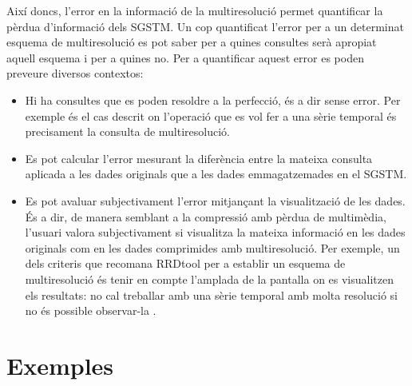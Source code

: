 Així doncs, l'error en la informació de la multiresolució permet
quantificar la pèrdua d'informació dels \gls{SGSTM}. Un cop
quantificat l'error per a un determinat esquema de multiresolució es
pot saber per a quines consultes serà apropiat aquell esquema i per a
quines no. Per a quantificar aquest error es poden preveure diversos
contextos:
\begin{itemize}
\item Hi ha consultes que es poden resoldre a la perfecció, és a dir
  sense error. Per exemple és el cas descrit on l'operació que es vol
  fer a una sèrie temporal és precisament la consulta de
  multiresolució.

\item Es pot calcular l'error mesurant la diferència entre la mateixa
  consulta aplicada a les dades originals que a les dades
  emmagatzemades en el \gls{SGSTM}.

\item Es pot avaluar subjectivament l'error mitjançant la
  visualització de les dades. És a dir, de manera semblant a la
  compressió amb pèrdua de multimèdia, l'usuari valora subjectivament
  si visualitza la mateixa informació en les dades originals com en
  les dades comprimides amb multiresolució. Per exemple, un dels
  criteris que recomana RRDtool per a establir un esquema de
  multiresolució és tenir en compte l'amplada de la pantalla on es
  visualitzen els resultats: no cal treballar amb una sèrie temporal
  amb molta resolució si no és possible observar-la \parencite[Rates,
  normalizing and consolidating]{vandenbogaerdt} .

\end{itemize}






\section{Exemples}



